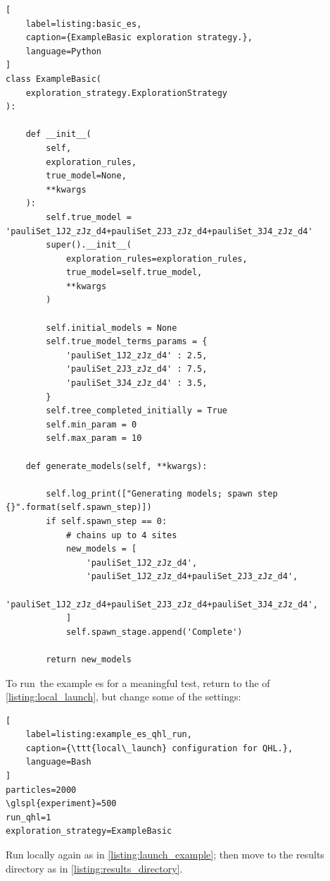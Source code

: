 \begin{lstlisting}[
    label=listing:basic_es,
    caption={ExampleBasic exploration strategy.},
    language=Python
]
class ExampleBasic(
    exploration_strategy.ExplorationStrategy
):

    def __init__(
        self,
        exploration_rules,
        true_model=None,
        **kwargs
    ):
        self.true_model = 'pauliSet_1J2_zJz_d4+pauliSet_2J3_zJz_d4+pauliSet_3J4_zJz_d4'
        super().__init__(
            exploration_rules=exploration_rules,
            true_model=self.true_model,
            **kwargs
        )

        self.initial_models = None
        self.true_model_terms_params = {
            'pauliSet_1J2_zJz_d4' : 2.5,
            'pauliSet_2J3_zJz_d4' : 7.5,
            'pauliSet_3J4_zJz_d4' : 3.5,
        }
        self.tree_completed_initially = True
        self.min_param = 0
        self.max_param = 10

    def generate_models(self, **kwargs):

        self.log_print(["Generating models; spawn step {}".format(self.spawn_step)])
        if self.spawn_step == 0:
            # chains up to 4 sites
            new_models = [
                'pauliSet_1J2_zJz_d4',
                'pauliSet_1J2_zJz_d4+pauliSet_2J3_zJz_d4',
                'pauliSet_1J2_zJz_d4+pauliSet_2J3_zJz_d4+pauliSet_3J4_zJz_d4',
            ]
            self.spawn_stage.append('Complete')

        return new_models

\end{lstlisting}


To run\footnotemark \ the example \gls{es} for a meaningful test, 
    return to the  of \cref{listing:local_launch}, 
    but change some of the settings:
\begin{lstlisting}[
    label=listing:example_es_qhl_run,
    caption={\ttt{local\_launch} configuration for QHL.},
    language=Bash
]
particles=2000
\glspl{experiment}=500
run_qhl=1
exploration_strategy=ExampleBasic
\end{lstlisting}

Run locally again as in \cref{listing:launch_example};
    then move to the \gls{results directory} as in \cref{listing:results_directory}. 
\par 



